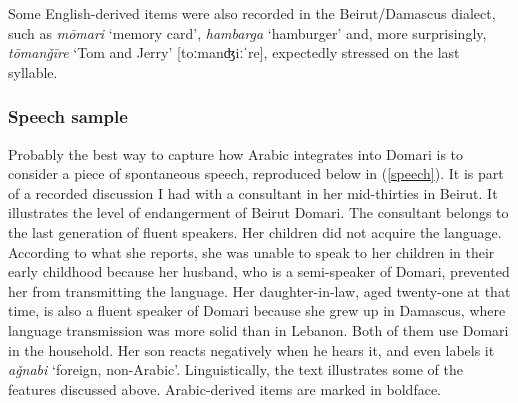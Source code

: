 \documentclass[output=paper]{langsci/langscibook}
\begin{document}
Some English-derived items were also recorded in the Beirut/Damascus dialect, such as \textit{mōmari} ‘memory card’, \textit{hambarga} ‘hamburger’ and, more surprisingly, \textit{tōman\v{g}īre} ‘Tom and Jerry’ [toːmanʤiːˈre], expectedly stressed on the last syllable.


 \subsubsection{Speech sample}

Probably the best way to capture how Arabic integrates into Domari is to consider a piece of spontaneous speech, reproduced below in (\ref{speech}). It is part of a recorded discussion I had with a consultant in her mid-thirties in Beirut. It illustrates the level of endangerment of Beirut Domari. The consultant belongs to the last generation of fluent speakers. Her children did not acquire the language. According to what she reports, she was unable to speak to her children in their early childhood because her husband, who is a semi-speaker of Domari, prevented her from transmitting the language. Her daughter-in-law, aged twenty-one at that time, is also a fluent speaker of Domari because she grew up in Damascus, where language transmission was more solid than in Lebanon. Both of them use Domari in the household. Her son reacts negatively when he hears it, and even labels it \textit{a\v{g}nabi} ‘foreign, non-Arabic’. Linguistically, the text illustrates some of the features discussed above. Arabic-derived items are marked in boldface. 
\end{document}
